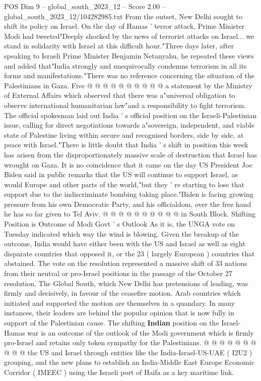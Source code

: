 \begin{textsample}{POS Dim 9 – global\_south\_2023\_12 – Score 2.00 – global\_south\_2023\_12/104282985.txt}
From the outset, New Delhi sought to shift its policy on Israel.
On the day of Hamas ' terror attack, Prime Minister Modi had tweeted"Deeply shocked by the news of terrorist attacks on Israel... we stand in solidarity with Israel at this difficult hour."Three days later, after speaking to Israeli Prime Minister Benjamin Netanyahu, he repeated these views and added that"India strongly and unequivocally condemns terrorism in all its forms and manifestations."There was no reference concerning the situation of the Palestinians in Gaza.
Five @ @ @ @ @ @ @ @ @ @ a statement by the Ministry of External Affairs which observed that there was a"universal obligation to observe international humanitarian law"and a responsibility to fight terrorism.
The official spokesman laid out India ' s official position on the Israeli-Palestinian issue, calling for direct negotiations towards a"sovereign, independent, and viable state of Palestine living within secure and recognised borders, side by side, at peace with Israel."There is little doubt that India ' s shift in position this week has arisen from the disproportionately massive scale of destruction that Israel has wrought on Gaza.
It is no coincidence that it came on the day US President Joe Biden said in public remarks that the US will continue to support Israel, as would Europe and other parts of the world,"but they ' re starting to lose that support due to the indiscriminate bombing taking place."Biden is facing growing pressure from his own Democratic Party, and his officialdom, over the free hand he has so far given to Tel Aviv. @ @ @ @ @ @ @ @ @ @ in South Block.
Shifting Position is Outcome of Modi Govt ' s Outlook As it is, the UNGA vote on Tuesday indicated which way the wind is blowing.
Given the breakup of the outcome, India would have either been with the US and Israel as well as eight disparate countries that opposed it, or the 23 ( largely European ) countries that abstained.
The vote on the resolution represented a massive shift of 33 nations from their neutral or pro-Israel positions in the passage of the October 27 resolution.
The Global South, which New Delhi has pretensions of leading, was firmly and decisively, in favour of the ceasefire motion.
Arab countries which initiated and supported the motion are themselves in a quandary.
In many instances, their leaders are behind the popular opinion that is now fully in support of the Palestinian cause.
The shifting \textbf{Indian} position on the Israel-Hamas war is an outcome of the outlook of the Modi government which is firmly pro-Israel and retains only token sympathy for the Palestinians. @ @ @ @ @ @ @ @ @ @ the US and Israel through entities like the India-Israel-US-UAE ( I2U2 ) grouping, and the new plans to establish an India-Middle East Europe Economic Corridor ( IMEEC ) using the Israeli port of Haifa as a key maritime link.

\end{textsample}
